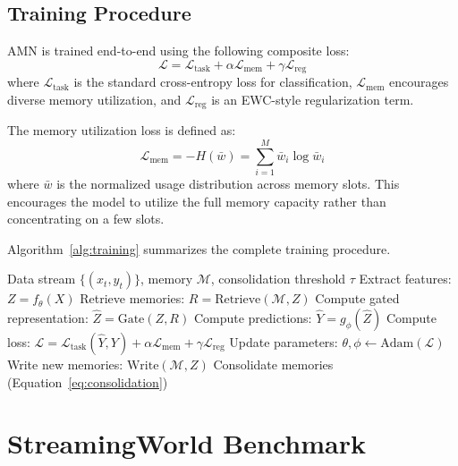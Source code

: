 \documentclass[11pt]{article}
\begin{document}
\subsection{Training Procedure}

AMN is trained end-to-end using the following composite loss:
\begin{equation}
    \mathcal{L} = \mathcal{L}_{\text{task}} + \alpha \mathcal{L}_{\text{mem}} + \gamma \mathcal{L}_{\text{reg}}
\end{equation}
where $\mathcal{L}_{\text{task}}$ is the standard cross-entropy loss for classification, $\mathcal{L}_{\text{mem}}$ encourages diverse memory utilization, and $\mathcal{L}_{\text{reg}}$ is an EWC-style regularization term.

The memory utilization loss is defined as:
\begin{equation}
    \mathcal{L}_{\text{mem}} = -H(\bar{w}) = \sum_{i=1}^{M} \bar{w}_i \log \bar{w}_i
\end{equation}
where $\bar{w}$ is the normalized usage distribution across memory slots. This encourages the model to utilize the full memory capacity rather than concentrating on a few slots.

Algorithm~\ref{alg:training} summarizes the complete training procedure.

\begin{algorithm}
\caption{AMN Training}
\label{alg:training}
\begin{algorithmic}[1]
\REQUIRE Data stream $\{(x_t, y_t)\}$, memory $\mathcal{M}$, consolidation threshold $\tau$
    \STATE Extract features: $Z = f_\theta(X)$
    \STATE Retrieve memories: $R = \text{Retrieve}(\mathcal{M}, Z)$
    \STATE Compute gated representation: $\hat{Z} = \text{Gate}(Z, R)$
    \STATE Compute predictions: $\hat{Y} = g_\phi(\hat{Z})$
    \STATE Compute loss: $\mathcal{L} = \mathcal{L}_{\text{task}}(\hat{Y}, Y) + \alpha \mathcal{L}_{\text{mem}} + \gamma \mathcal{L}_{\text{reg}}$
    \STATE Update parameters: $\theta, \phi \leftarrow \text{Adam}(\mathcal{L})$
    \STATE Write new memories: $\text{Write}(\mathcal{M}, Z)$
        \STATE Consolidate memories (Equation~\ref{eq:consolidation})
    \ENDIF
\ENDFOR
\end{algorithmic}
\end{algorithm}

\section{StreamingWorld Benchmark}
\label{sec:benchmark}
\end{document}
